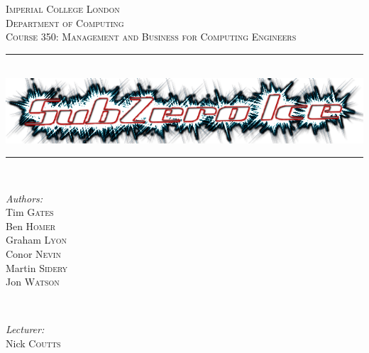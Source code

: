\documentclass{article}
\begin{document}
\setlength\parindent{0pt}


\begin{titlepage}
\newcommand{\HRule}{\rule{\linewidth}{0.5mm}}
\center
\textsc{\LARGE Imperial College London}  \\[1.5cm]
\textsc{\Large Department of Computing}  \\[0.5cm]
\textsc{\large Course 350: Management and Business for Computing Engineers} \\[0.5cm]

\HRule \\[0.6cm]
\includegraphics[scale=0.7]{logo.png} \\
\HRule \\[1.5cm]

\begin{minipage}{0.4\textwidth}

\begin{flushleft} \large \emph{Authors:} \\
Tim       \textsc{Gates}   \\
Ben       \textsc{Homer}   \\
Graham    \textsc{Lyon}    \\
Conor     \textsc{Nevin}   \\
Martin    \textsc{Sidery}  \\
Jon       \textsc{Watson}  \\
\end{flushleft}

\end{minipage}~
\begin{minipage}{0.4\textwidth}

\begin{flushright} \large \emph{Lecturer:} \\
Nick \textsc{Coutts}
\end{flushright}

\end{minipage}\\[2cm]


\end{titlepage}
\end{document}
